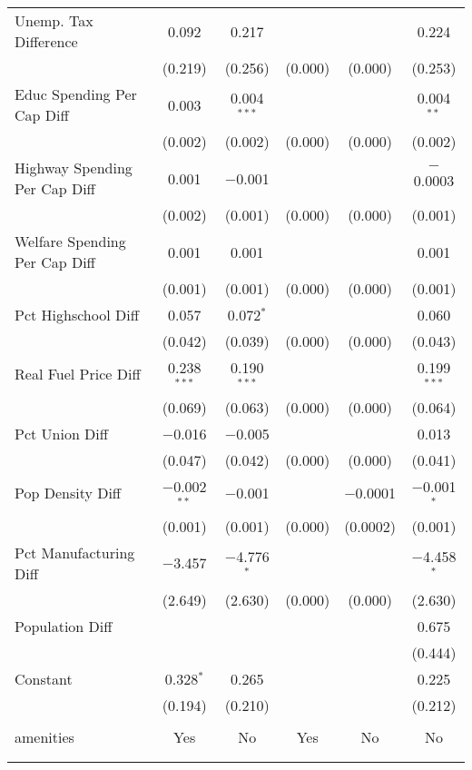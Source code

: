 \begin{table}[!htbp]
\begin{tabular}{@{\extracolsep{5pt}}lccccc}
  Unemp. Tax Difference & 0.092 & 0.217 &  &  & 0.224 \\ 
  & (0.219) & (0.256) & (0.000) & (0.000) & (0.253) \\ 
  Educ Spending Per Cap Diff & 0.003 & 0.004$^{***}$ &  &  & 0.004$^{**}$ \\ 
  & (0.002) & (0.002) & (0.000) & (0.000) & (0.002) \\ 
  Highway Spending Per Cap Diff & 0.001 & $-$0.001 &  &  & $-$0.0003 \\ 
  & (0.002) & (0.001) & (0.000) & (0.000) & (0.001) \\ 
  Welfare Spending Per Cap Diff & 0.001 & 0.001 &  &  & 0.001 \\ 
  & (0.001) & (0.001) & (0.000) & (0.000) & (0.001) \\ 
  Pct Highschool Diff & 0.057 & 0.072$^{*}$ &  &  & 0.060 \\ 
  & (0.042) & (0.039) & (0.000) & (0.000) & (0.043) \\ 
  Real Fuel Price Diff & 0.238$^{***}$ & 0.190$^{***}$ &  &  & 0.199$^{***}$ \\ 
  & (0.069) & (0.063) & (0.000) & (0.000) & (0.064) \\ 
  Pct Union Diff & $-$0.016 & $-$0.005 &  &  & 0.013 \\ 
  & (0.047) & (0.042) & (0.000) & (0.000) & (0.041) \\ 
  Pop Density Diff & $-$0.002$^{**}$ & $-$0.001 &  & $-$0.0001 & $-$0.001$^{*}$ \\ 
  & (0.001) & (0.001) & (0.000) & (0.0002) & (0.001) \\ 
  Pct Manufacturing Diff & $-$3.457 & $-$4.776$^{*}$ &  &  & $-$4.458$^{*}$ \\ 
  & (2.649) & (2.630) & (0.000) & (0.000) & (2.630) \\ 
  Population Diff &  &  &  &  & 0.675 \\ 
  &  &  &  &  & (0.444) \\ 
  Constant & 0.328$^{*}$ & 0.265 &  &  & 0.225 \\ 
  & (0.194) & (0.210) &  &  & (0.212) \\ 
 \hline \\[-1.8ex] 
amenities & Yes & No & Yes & No & No \\ 
\hline \\[-1.8ex] 
\hline 
\hline \\[-1.8ex] 
\end{tabular} 
\end{table} 
